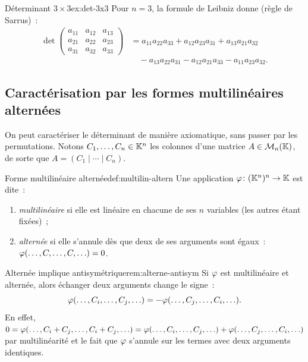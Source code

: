 \begin{example}{Déterminant $3\times 3$}{ex:det-3x3}
  Pour $n=3$, la formule de Leibniz donne (règle de Sarrus)~:
  \begin{align*}
    \det\begin{pmatrix}a_{11}&a_{12}&a_{13}\\a_{21}&a_{22}&a_{23}\\
    a_{31}&a_{32}&a_{33}\end{pmatrix}
    &= a_{11}a_{22}a_{33}+a_{12}a_{23}a_{31}+a_{13}a_{21}a_{32}\\
    &\quad -a_{13}a_{22}a_{31}-a_{12}a_{21}a_{33}-a_{11}a_{23}a_{32}.
  \end{align*}
\end{example}

\subsection{Caractérisation par les formes multilinéaires alternées}%
\label{subsec:multilin-altern}

On peut caractériser le déterminant de manière axiomatique, sans passer
par les permutations. Notons $C_1,\ldots,C_n\in{\mathbb{K}}^n$ les colonnes d'une
matrice $A\in\mathcal{M}_n({\mathbb{K}})$, de sorte que $A=(C_1\mid\cdots\mid C_n)$.

\begin{definition}{Forme multilinéaire alternée}{def:multilin-altern}
  Une application $\varphi\colon({\mathbb{K}}^n)^n\to{\mathbb{K}}$ est dite~:
  \begin{enumerate}[label=(\roman*)]
    \item \emph{multilinéaire} si elle est
      linéaire en chacune de ses $n$ variables (les autres étant fixées)~;
    \item \emph{alternée} si elle s'annule dès que
      deux de ses arguments sont égaux~:
      $\varphi(\ldots,C,\ldots,C,\ldots)=0$.
  \end{enumerate}
\end{definition}

\begin{remark}{Alternée implique antisymétrique}{rem:alterne-antisym}
  Si $\varphi$ est multilinéaire et alternée, alors échanger deux arguments
  change le signe~:
  \[
    \varphi(\ldots,C_i,\ldots,C_j,\ldots)
    =-\varphi(\ldots,C_j,\ldots,C_i,\ldots).
  \]
  En effet,
  $0=\varphi(\ldots,C_i+C_j,\ldots,C_i+C_j,\ldots)
  =\varphi(\ldots,C_i,\ldots,C_j,\ldots)+\varphi(\ldots,C_j,\ldots,C_i,\ldots)$
  par multilinéarité et le fait que $\varphi$ s'annule sur les termes
  avec deux arguments identiques.
\end{remark}

